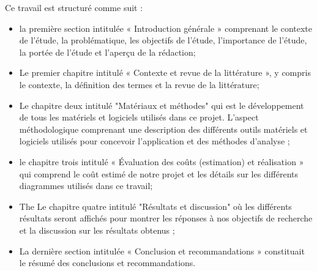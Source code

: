 \documentclass[english,12pt,a4paper]{report}
\begin{document}
Ce travail est structuré comme suit :

\begin{itemize}
	\item 	la première section intitulée « Introduction générale » comprenant le contexte de l'étude, la problématique, les objectifs de l'étude, l'importance de l'étude, la portée de l'étude et l'aperçu de la rédaction; 
	\item 	 Le premier chapitre intitulé « Contexte et revue de la littérature », y compris le contexte, la définition des termes et la revue de la littérature; 
	\item 	 Le chapitre deux intitulé "Matériaux et méthodes" qui est le développement de tous les matériels et logiciels utilisés dans ce projet. L'aspect méthodologique comprenant une description des différents outils matériels et logiciels utilisés pour concevoir l'application et des méthodes d'analyse ; 
	\item 	le chapitre trois intitulé « Évaluation des coûts (estimation) et réalisation » qui comprend le coût estimé de notre projet et les détails sur les différents diagrammes utilisés dans ce travail; 
	\item The  Le chapitre quatre intitulé "Résultats et discussion" où les différents résultats seront affichés pour montrer les réponses à nos objectifs de recherche et la discussion sur les résultats obtenus ; 
	\item  La dernière section intitulée « Conclusion et recommandations » constituait le résumé des conclusions et recommandations. 
\end{itemize}
\end{document}
